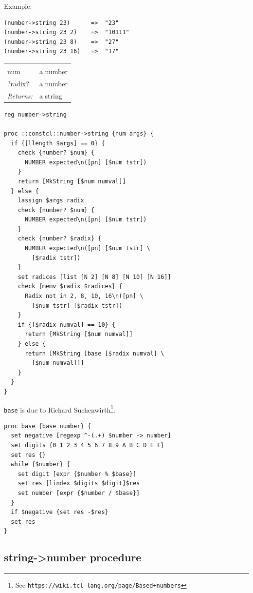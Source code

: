 \documentclass[a5paper,draft]{memoir}
\begin{document}
Example:

\begin{verbatim}
(number->string 23)      =>  "23"
(number->string 23 2)    =>  "10111"
(number->string 23 8)    =>  "27"
(number->string 23 16)   =>  "17"
\end{verbatim}

\noindent\begin{tabular}{ |p{1.9cm} p{6.5cm}| }
\hline
\rowcolor[HTML]{CCCCCC} \multicolumn{2}{|l|}{\textbf{number->string (public)}} \\
num & a number \\
?radix? & a number \\
\textit{Returns:} & a string \\
\hline
\end{tabular}

\begin{lstlisting}
reg number->string

proc ::constcl::number->string {num args} {
  if {[llength $args] == 0} {
    check {number? $num} {
      NUMBER expected\n([pn] [$num tstr])
    }
    return [MkString [$num numval]]
  } else {
    lassign $args radix
    check {number? $num} {
      NUMBER expected\n([pn] [$num tstr])
    }
    check {number? $radix} {
      NUMBER expected\n([pn] [$num tstr] \
        [$radix tstr])
    }
    set radices [list [N 2] [N 8] [N 10] [N 16]]
    check {memv $radix $radices} {
      Radix not in 2, 8, 10, 16\n([pn] \
        [$num tstr] [$radix tstr])
    }
    if {[$radix numval] == 10} {
      return [MkString [$num numval]]
    } else {
      return [MkString [base [$radix numval] \
        [$num numval]]]
    }
  }
}
\end{lstlisting}

\texttt{base} is due to Richard Suchenwirth\footnote{See \texttt{https://wiki.tcl-lang.org/page/Based+numbers}}.

\begin{lstlisting}
proc base {base number} {
  set negative [regexp ^-(.+) $number -> number]
  set digits {0 1 2 3 4 5 6 7 8 9 A B C D E F}
  set res {}
  while {$number} {
    set digit [expr {$number % $base}]
    set res [lindex $digits $digit]$res
    set number [expr {$number / $base}]
  }
  if $negative {set res -$res}
  set res
}
\end{lstlisting}

\subsection{string->number procedure}
\label{stringnumber-procedure}
\end{document}
